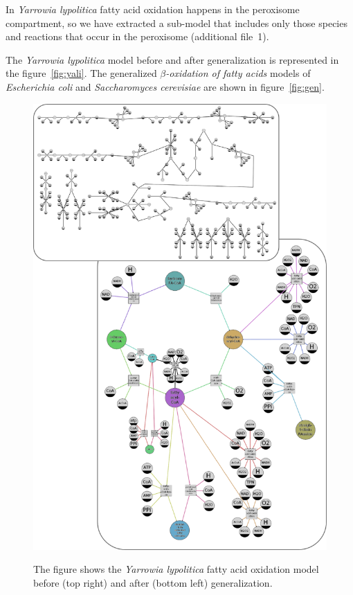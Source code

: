 \documentclass[10pt]{bmc_article}
\newenvironment{bmcformat}{\baselineskip20pt\sloppy\setboolean{publ}{false}}{\baselineskip20pt\sloppy}
\begin{document}
\begin{bmcformat}
In \textit{Yarrowia lypolitica} fatty acid oxidation happens in the peroxisome compartment, so we have extracted a sub-model that includes only those species and reactions that occur in the peroxisome (additional file~1). 

The \textit{Yarrowia lypolitica} model before and after generalization is represented in the figure~\ref{fig:yali}.
The generalized \textit{$\beta$-oxidation of fatty acids} models of \textit{Escherichia coli} and \textit{Saccharomyces cerevisiae} are shown in figure~\ref{fig:gen}.
 
\begin{figure}  
\includegraphics[scale=1]{pics/yali.png} 

      The figure shows the \textit{Yarrowia lypolitica} fatty acid oxidation model before (top right) and after (bottom left) generalization. 
      

\end{figure}
\end{bmcformat}
\end{document}
